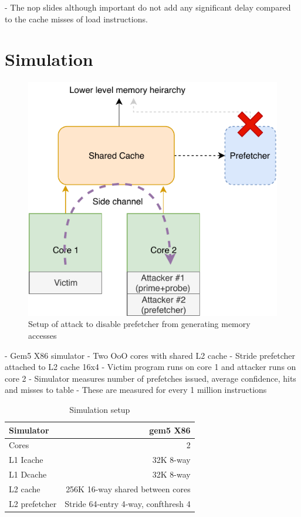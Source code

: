 \documentclass[conference]{IEEEtran}
\begin{document}
 - The nop slides although important do not add any significant delay
   compared to the cache misses of load instructions.

\section{Simulation}

\begin{figure}[htbp]
    \centering
    \includegraphics[width=\columnwidth]{prefetch_attack}
    \caption{Setup of attack to disable prefetcher from generating memory accesses}
    \label{fig:prefetch_setup}
\end{figure}

 - Gem5 X86 simulator
 - Two OoO cores with shared L2 cache
 - Stride prefetcher attached to L2 cache 16x4
 - Victim program runs on core 1 and attacker runs on core 2
 - Simulator measures number of prefetches issued, average confidence,
   hits and misses to table
 - These are measured for every 1 million instructions


\begin{table}
\centering
\begin{tabular}{|l|r|}
    \hline
    Simulator  & gem5 X86\\
    \hline
    Cores  & 2\\
    \hline
    L1 Icache & 32K 8-way\\
    \hline
    L1 Dcache & 32K 8-way\\
    \hline
    L2 cache & 256K 16-way shared between cores\\
    \hline
    L2 prefetcher  & Stride 64-entry 4-way, confthresh 4\\
    \hline
\end{tabular}
\\
\caption{Simulation setup}
\label{tab:simulation_setup}
\end{table}
\end{document}

